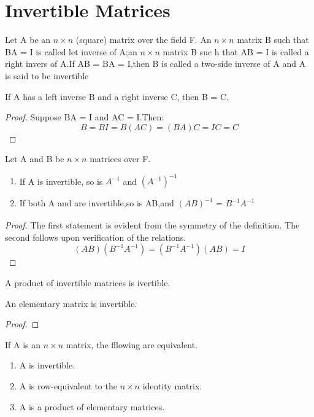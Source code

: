 \section{Invertible Matrices}

\begin{definition}
	Let A be an $n \times n$ (square) matrix over the field F. An $n \times n$ matrix B such that BA = I is called let inverse of A;an $n \times n$ matrix B suc h that AB = I is called a right invers of A.If AB = BA = I,then B is called a two-side inverse of A and A is said to be invertible
\end{definition}

\begin{lemma}
	If A has a left inverse B and a right inverse C, then B = C.
	\begin{proof}
		Suppose BA = I and AC = I.Then: \[
			B = BI = B(AC) = (BA)C = IC = C
		\]
	\end{proof}
\end{lemma}

\begin{theorem}
	Let A and B be $n \times n$ matrices over F.
	\begin{enumerate}
		\item If A is invertible, so is $A_{}^{-1}$ and $(A_{}^{-1})^{-1}$
		\item If both A and  are invertible,so is AB,and $(AB)_{}^{-1}$ = $B_{}^{-1}A_{}^{-1}$

	\end{enumerate}
	\begin{proof}
		The first statement is evident from the symmetry of the definition. The second follows upon verification of the relations.
		\[
			(AB)(B_{}^{-1}A_{}^{-1}) = (B_{}^{-1}A_{}^{-1})(AB) = I
		\]
	\end{proof}
\end{theorem}


\begin{corollary}
	A product of invertible matrices is ivertible.
\end{corollary}

\begin{theorem}[]
	An elementary matrix is invertible.
\end{theorem}

\begin{proof}

\end{proof}


\begin{theorem}
	If A is an $n \times n$ matrix, the fllowing are equivalent.
	\begin{enumerate}
		\item A is invertible.
		\item A is row-equivalent to the $n \times n$ identity matrix.
		\item A is a product of elementary matrices.
	\end{enumerate}
\end{theorem}

